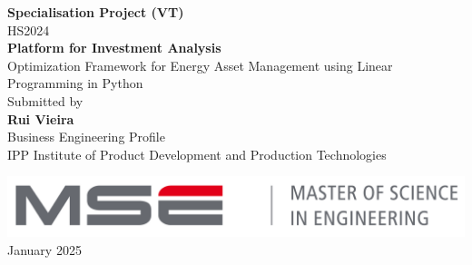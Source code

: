\begin{titlepage}

\begin{center}

\textup{\small {\bf Specialisation Project (VT) } \\  HS2024}\\[3.0in]

\fontsize{20}{24}\selectfont
\textbf {Platform for Investment Analysis}\\
\normalsize Optimization Framework for Energy Asset Management using Linear Programming in Python\\[3.0in]


       

\normalsize Submitted by \\[0.2in]
\textbf{Rui Vieira}\\
Business Engineering Profile\\
IPP Institute of Product Development and Production Technologies\\

\vspace{.2in}




\vspace{.3in}

\includegraphics[width=0.4 \textwidth]{images/mse.png}\\[0.1in]

January 2025

\end{center}

\end{titlepage}